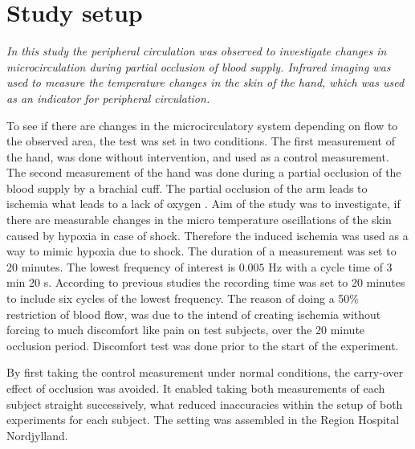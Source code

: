 \chapter{Study setup}

\textit{In this study the peripheral circulation was observed to investigate changes in microcirculation during partial occlusion of blood supply. Infrared imaging was used to measure the temperature changes in the skin of the hand, which was used as an indicator for peripheral circulation.} 


To see if there are changes in the microcirculatory system depending on flow to the observed area, the test was set in two conditions. The first measurement of the hand, was done without intervention, and used as a control measurement. The second measurement of the hand was done during a partial occlusion of the blood supply by a brachial cuff. The partial occlusion of the arm leads to ischemia what leads to a lack of oxygen \cite{martini2012}. Aim of the study was to investigate, if there are measurable changes in the micro temperature oscillations of the skin caused by hypoxia in case of shock. Therefore the induced ischemia was used as a way to mimic hypoxia due to shock.
The duration of a measurement was set to 20 minutes. The lowest frequency of interest is $0.005$ Hz with a cycle time of 3 min 20 s. According to previous studies the recording time was set to 20 minutes to include six cycles of the lowest frequency.\cite{sagaidachnyi2014}
The reason of doing a 50\% restriction of blood flow, was due to the intend of creating ischemia without forcing to much discomfort like pain on test subjects, over the 20 minute occlusion period. Discomfort test was done prior to the start of the experiment.

By first taking the control measurement under normal conditions, the carry-over effect of occlusion was avoided. It enabled taking both measurements of each subject straight successively, what reduced inaccuracies within the setup of both experiments for each subject. The setting was assembled in the Region Hospital Nordjylland.